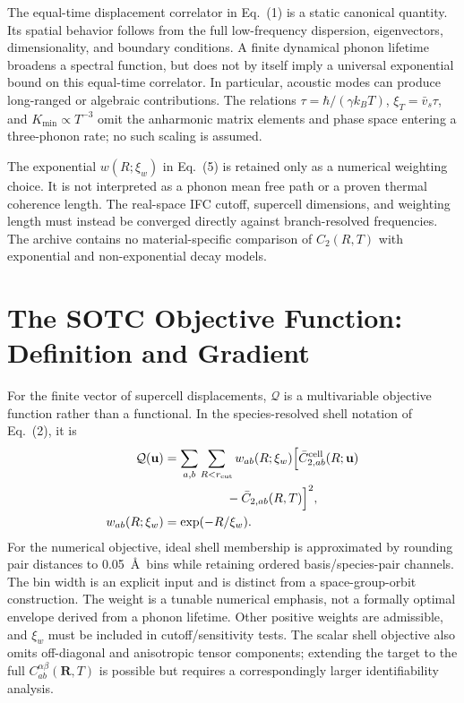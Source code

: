 \documentclass[aps,prb,reprint,amsmath,amssymb,floatfix]{revtex4-2}
\begin{document}
The equal-time displacement correlator in Eq.~(1) is a static canonical
quantity. Its spatial behavior follows from the full low-frequency dispersion,
eigenvectors, dimensionality, and boundary conditions. A finite dynamical
phonon lifetime broadens a spectral function, but does not by itself imply a
universal exponential bound on this equal-time correlator. In particular,
acoustic modes can produce long-ranged or algebraic contributions. The relations
\(\tau=\hbar/(\gamma k_BT)\),
\(\xi_T=\bar v_s\tau\), and
\(K_{\min}\propto T^{-3}\) omit the anharmonic matrix elements and phase
space entering a three-phonon rate; no such scaling is assumed.

The exponential \(w(R;\xi_w)\) in Eq.~(5) is retained only as a numerical
weighting choice. It is not interpreted as a phonon mean free path or a proven
thermal coherence length. The real-space IFC cutoff, supercell dimensions, and
weighting length must instead be converged directly against branch-resolved
frequencies. The archive contains no material-specific comparison of
\(C_2(R,T)\) with exponential and non-exponential decay models.

\section{The SOTC Objective Function: Definition and
Gradient}\label{appendix-c-the-sotc-objective-functional-derivation-and-gradient}

For the finite vector of supercell displacements, \(\mathcal Q\) is a
multivariable objective function rather than a functional. In the
species-resolved shell notation of Eq.~(2), it is
\begin{align*}
\mathcal Q(\mathbf u)
 &=\sum_{a,b}\sum_{R<r_{\rm cut}}w_{ab}(R;\xi_w)
 \Bigl[\bar C_{2,ab}^{\rm cell}(R;\mathbf u)\nonumber\\
 &\hspace{5em}-\bar C_{2,ab}(R,T)\Bigr]^2,\\
w_{ab}(R;\xi_w)&=\exp(-R/\xi_w).
\end{align*}
For the numerical objective, ideal shell membership is approximated by rounding
pair distances to 0.05~\AA\ bins while retaining ordered basis/species-pair
channels. The bin width is an explicit input and is distinct from a
space-group-orbit construction.
The weight is a tunable numerical emphasis, not a formally optimal envelope
derived from a phonon lifetime. Other positive weights are admissible, and
\(\xi_w\) must be included in cutoff/sensitivity tests. The scalar shell
objective also omits off-diagonal and anisotropic tensor components; extending
the target to the full \(C_{ab}^{\alpha\beta}(\mathbf R,T)\) is possible but
requires a correspondingly larger identifiability analysis.
\end{document}
